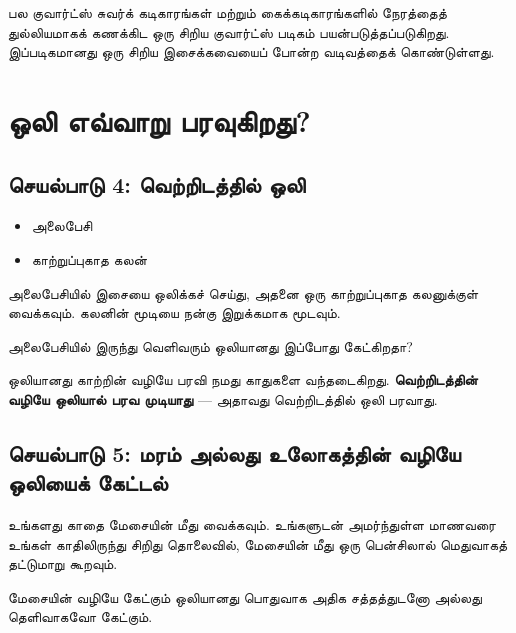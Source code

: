 \documentclass[12pt,a4paper]{tufte-handout}
\begin{document}
\begin{tcolorbox}[didyouknowbox]
பல குவார்ட்ஸ் சுவர்க் கடிகாரங்கள் மற்றும் கைக்கடிகாரங்களில் நேரத்தைத் துல்லியமாகக்
கணக்கிட ஒரு சிறிய குவார்ட்ஸ் படிகம் பயன்படுத்தப்படுகிறது. இப்படிகமானது ஒரு சிறிய
இசைக்கவையைப் போன்ற வடிவத்தைக் கொண்டுள்ளது.
\end{tcolorbox}

\section{ஒலி எவ்வாறு பரவுகிறது?}

\subsection*{செயல்பாடு 4: வெற்றிடத்தில் ஒலி}

\begin{tcolorbox}[activitybox, title=தேவையான பொருட்கள்]
\begin{itemize}[noitemsep]
  \item அலைபேசி
  \item காற்றுப்புகாத கலன்
\end{itemize}
\end{tcolorbox}

அலைபேசியில் இசையை ஒலிக்கச் செய்து, அதனை ஒரு காற்றுப்புகாத கலனுக்குள் வைக்கவும்.
கலனின் மூடியை நன்கு இறுக்கமாக மூடவும்.

\begin{tcolorbox}[observebox]
அலைபேசியில் இருந்து வெளிவரும் ஒலியானது இப்போது கேட்கிறதா?
\end{tcolorbox}

\begin{tcolorbox}[discussbox]
ஒலியானது காற்றின் வழியே பரவி நமது காதுகளை வந்தடைகிறது. \textbf{வெற்றிடத்தின் வழியே
ஒலியால் பரவ முடியாது} --- அதாவது வெற்றிடத்தில் ஒலி பரவாது.
\end{tcolorbox}

\subsection*{செயல்பாடு 5: மரம் அல்லது உலோகத்தின் வழியே ஒலியைக் கேட்டல்}

உங்களது காதை மேசையின் மீது வைக்கவும். உங்களுடன் அமர்ந்துள்ள மாணவரை உங்கள்
காதிலிருந்து சிறிது தொலைவில், மேசையின் மீது ஒரு பென்சிலால் மெதுவாகத் தட்டுமாறு கூறவும்.

\begin{tcolorbox}[observebox]
மேசையின் வழியே கேட்கும் ஒலியானது பொதுவாக அதிக சத்தத்துடனோ அல்லது தெளிவாகவோ கேட்கும்.
\end{tcolorbox}
\end{document}
